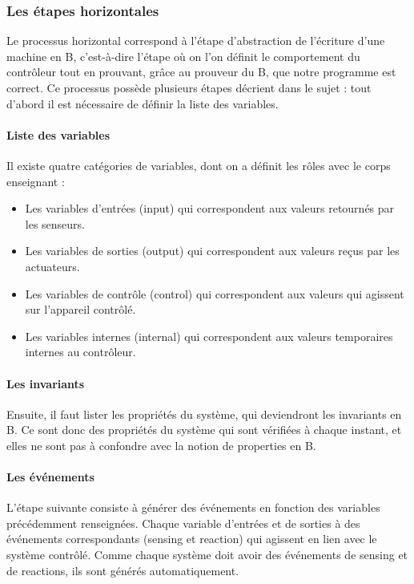 \documentclass{article}
\begin{document}
\subsubsection{Les étapes horizontales}
    Le processus horizontal correspond à l'étape d'abstraction de l'écriture d'une machine en B, c'est-à-dire l'étape où on l'on définit le comportement du contrôleur tout en prouvant, grâce au prouveur du B, que notre programme est correct. Ce processus possède plusieurs étapes décrient dans le sujet : tout d'abord il est nécessaire de définir la liste des variables. 
    
\paragraph{Liste des variables}
    Il existe quatre catégories de variables, dont on a définit les rôles avec le corps enseignant :
    
        \begin{itemize}
            \item Les variables d'entrées (input) qui correspondent aux valeurs retournés par les senseurs.
            \item Les variables de sorties (output) qui correspondent aux valeurs reçus par les actuateurs.
            \item Les variables de contrôle (control) qui correspondent aux valeurs qui agissent sur l'appareil contrôlé.
            \item Les variables internes (internal) qui correspondent aux valeurs temporaires internes au contrôleur.
        \end{itemize}
        
\paragraph{Les invariants} Ensuite, il faut lister les propriétés du système, qui deviendront les invariants en B. Ce sont donc des propriétés du système qui sont vérifiées à chaque instant, et elles ne sont pas à confondre avec la notion de properties en B.

\paragraph{Les événements} L'étape suivante consiste à générer des événements en fonction des variables précédemment renseignées. Chaque variable d'entrées et de sorties à des événements correspondants (sensing et reaction) qui agissent en lien avec le système contrôlé. Comme chaque système doit avoir des événements de sensing et de reactions, ils sont générés automatiquement.
\end{document}
